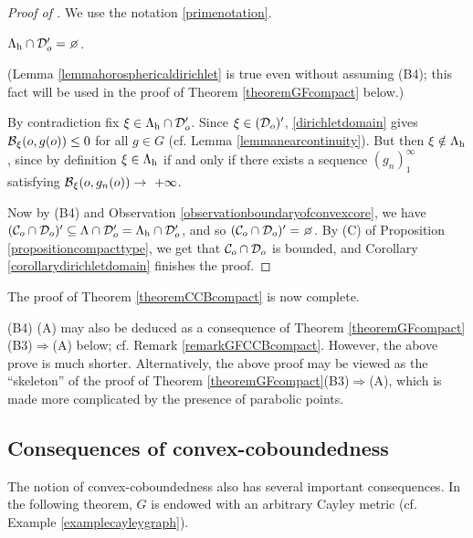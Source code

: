 \begin{proof}[Proof of ]
We use the notation \eqref{primenotation}.
\begin{lemma}
\label{lemmahorosphericaldirichlet}
$\Lh\cap\DD_\zero' = \emptyset$.
\end{lemma}
(Lemma \ref{lemmahorosphericaldirichlet} is true even without assuming (B4); this fact will be used in the proof of Theorem \ref{theoremGFcompact} below.)
\begin{subproof}
By contradiction fix $\xi\in\Lambda_{\mathrm h}\cap\mathcal D_o'$. Since $\xi\in(\mathcal D_o)'$, \eqref{dirichletdomain} gives $\operatorname{\mathcal B}_\xi(o,g(o)) \leq 0$ for all $g\in G$ (cf. Lemma \ref{lemmanearcontinuity}). But then $\xi \notin \Lambda_{\mathrm h}$, since by definition $\xi\in \Lambda_{\mathrm h}$ if and only if there exists a sequence $(g_n)_1^\infty$ satisfying $\operatorname{\mathcal B}_\xi(o,g_n(o)) \to \ +\infty$.
\end{subproof}

Now by (B4) and Observation \ref{observationboundaryofconvexcore}, we have $(\mathcal C_o\cap \mathcal D_o)' \subseteq \Lambda\cap\mathcal D_o' = \Lambda_{\mathrm h}\cap \mathcal D_o'$, and so $(\CC_\zero\cap\DD_\zero)' = \emptyset$. By (C) of Proposition \ref{propositioncompacttype}, we get that $\mathcal C_o\cap\mathcal D_o$ is bounded, and Corollary \ref{corollarydirichletdomain} finishes the proof.
\end{proof}
\noindent The proof of Theorem \ref{theoremCCBcompact} is now complete.

\begin{remark}
(B4) \implies (A) may also be deduced as a consequence of Theorem \ref{theoremGFcompact}(B3)$\Rightarrow$(A) below; cf. Remark \ref{remarkGFCCBcompact}. However, the above prove is much shorter. Alternatively, the above proof may be viewed as the ``skeleton'' of the proof of Theorem \ref{theoremGFcompact}(B3)$\Rightarrow$(A), which is made more complicated by the presence of parabolic points.
\end{remark}

\subsection{Consequences of convex-coboundedness}
The notion of convex-coboundedness also has several important consequences. In the following theorem, $G$ is endowed with an arbitrary Cayley metric (cf. Example \ref{examplecayleygraph}).

